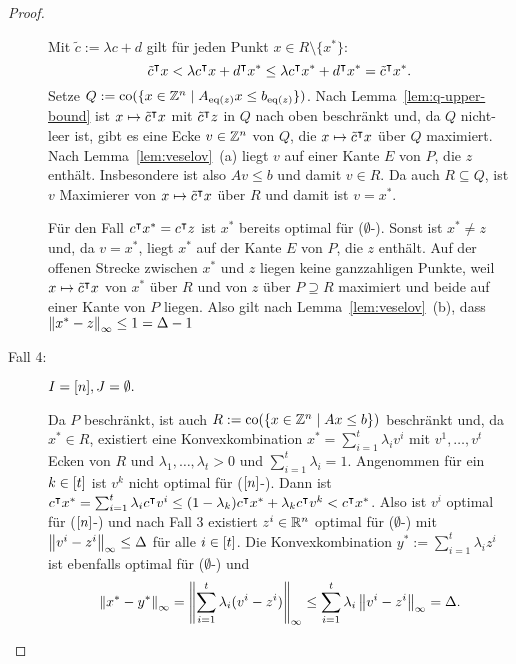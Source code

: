 \begin{proof}
\begin{description}
		Mit $\tilde{c}:=\lambda c+d$ gilt für jeden Punkt $x\in R\setminus\{x^*\}$:
		$$\tilde{c}^\intercal x < \lambda c^\intercal x + d^\intercal x^*\leq \lambda c^\intercal x^* + d^\intercal x^* = \tilde{c}^\intercal x^*.$$
		Setze $Q:=\operatorname{co}(\{x\in\mathbb{Z}^n \mid A_{\operatorname{eq}(z)}x \leq b_{\operatorname{eq}(z)} \})$.
		Nach Lemma~\ref{lem:q-upper-bound} ist $x\mapsto \tilde{c}^\intercal x$ mit $\tilde{c}^\intercal z$ in $Q$ nach oben beschränkt und, da $Q$ nicht-leer ist, gibt es eine Ecke $v\in\mathbb{Z}^n$ von $Q$, die $x\mapsto\tilde{c}^\intercal x$ über $Q$ maximiert.
		Nach Lemma~\ref{lem:veselov}~(a) liegt $v$ auf einer Kante $E$ von $P$, die $z$ enthält.
		Insbesondere ist also $Av\leq b$ und damit $v\in R$.
		Da auch $R \subseteq Q$, ist $v$ Maximierer von $x\mapsto \tilde{c}^\intercal x$ über $R$ und damit ist $v=x^*$.
		
		Für den Fall $c^\intercal x^*=c^\intercal z$ ist $x^*$ bereits optimal für ($\emptyset$-\MIPI).
		Sonst ist $x^* \neq z$ und, da $v=x^*$, liegt $x^*$ auf der Kante $E$ von $P$, die $z$ enthält.
		Auf der offenen Strecke zwischen $x^*$ und $z$ liegen keine ganzzahligen Punkte, weil $x\mapsto \tilde{c}^\intercal x$ von $x^*$ über $R$ und von $z$ über $P\supseteq R$ maximiert und beide auf einer Kante von $P$ liegen.
		Also gilt nach Lemma~\ref{lem:veselov}~(b), dass $\left\lVert x^*-z\right\rVert_\infty\leq 1 = \Delta -1 $
		
		\item[Fall 4:] $I=[n],J=\emptyset.$
		
		Da $P$ beschränkt, ist auch $R:=\operatorname{co}(\{x\in\mathbb{Z}^n \mid Ax\leq b\})$ beschränkt und, da $x^*\in R$, existiert eine Konvexkombination $x^* = \sum_{i=1}^t \lambda_i v^i$ mit $v^1,\dots,v^t$ Ecken von $R$ und $\lambda_1,\dots,\lambda_t>0$ und $\sum_{i=1}^t \lambda_i=1$.
		Angenommen für ein $k\in[t]$ ist $v^k$ nicht optimal für ($[n]$-\MIPI).
		Dann ist $c^\intercal x^*=\sum_{i=1}^t \lambda_i c^\intercal v^i \leq (1-\lambda_k)c^\intercal x^* + \lambda_k c^\intercal v^k < c^\intercal x^*$.
		Also ist $v^i$ optimal für ($[n]$-\MIPI) und nach Fall 3 existiert $z^i\in\mathbb{R}^n$ optimal für ($\emptyset$-\MIPI) mit $\left\lVert v^i-z^i\right\rVert_\infty\leq \Delta$ für alle $i\in[t]$.
		Die Konvexkombination $y^*:=\sum_{i=1}^t \lambda_i z^i$ ist ebenfalls optimal für ($\emptyset$-\MIPI) und
		$$\left\lVert x^*-y^*\right\rVert_\infty=\left\lVert\sum_{i=1}^t \lambda_i (v^i-z^i)\right\rVert_\infty\leq \sum_{i=1}^t \lambda_i \left\lVert v^i-z^i\right\rVert_\infty=\Delta.$$
	\end{description}
\end{proof}